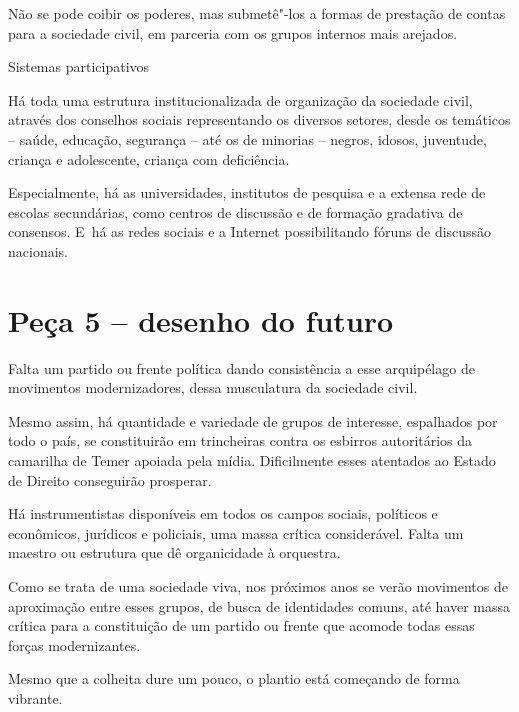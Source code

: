 Não se pode coibir os poderes, mas submetê"-los a formas de prestação de
contas para a sociedade civil, em parceria com os grupos internos mais
arejados.

Sistemas participativos

Há toda uma estrutura institucionalizada de organização da sociedade
civil, através dos conselhos sociais representando os diversos setores,
desde os temáticos -- saúde, educação, segurança -- até os de minorias
-- negros, idosos, juventude, criança e adolescente, criança com
deficiência.

Especialmente, há as universidades, institutos de pesquisa e a extensa
rede de escolas secundárias, como centros de discussão e de formação
gradativa de consensos. E~há as redes sociais e a Internet
possibilitando fóruns de discussão nacionais.

\section{Peça 5 -- desenho do futuro}

Falta um partido ou frente política dando consistência a esse
arquipélago de movimentos modernizadores, dessa musculatura da sociedade
civil.

Mesmo assim, há quantidade e variedade de grupos de interesse,
espalhados por todo o país, se constituirão em trincheiras contra os
esbirros autoritários da camarilha de Temer apoiada pela mídia.
Dificilmente esses atentados ao Estado de Direito conseguirão prosperar.

Há instrumentistas disponíveis em todos os campos sociais, políticos e
econômicos, jurídicos e policiais, uma massa crítica considerável. Falta
um maestro ou estrutura que dê organicidade à orquestra.

Como se trata de uma sociedade viva, nos próximos anos se verão
movimentos de aproximação entre esses grupos, de busca de identidades
comuns, até haver massa crítica para a constituição de um partido ou
frente que acomode todas essas forças modernizantes.

Mesmo que a colheita dure um pouco, o plantio está começando de forma
vibrante.
